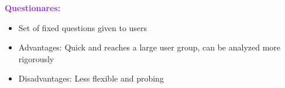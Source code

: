 \documentclass[a4paper,10pt]{article}
\begin{document}
\textcolor{BlueViolet}{\textbf{Questionares:}}
\renewcommand{\labelitemi}{\textperiodcentered}
\begin{itemize}
\item Set of fixed questions given to users 
\item Advantages: Quick and reaches a large user group, can be analyzed more rigorously  
\item Disadvantages: Less flexible and probing 
\end{itemize}
\end{document}
